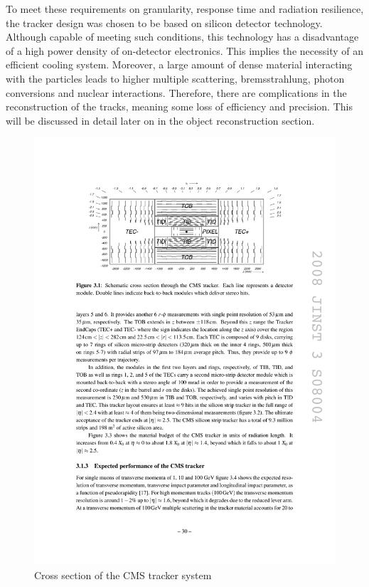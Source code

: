 To meet these requirements on granularity, response time and radiation resilience, the tracker design was chosen to be
based on silicon detector technology. Although capable of meeting such conditions, this technology has a disadvantage of
a high power density of on-detector electronics. This implies the necessity of an efficient cooling system. Moreover, a
large amount of dense material interacting with the particles leads to higher multiple scattering, bremsstrahlung,
photon conversions and nuclear interactions. Therefore, there are complications in the reconstruction of the tracks,
meaning some loss of efficiency and precision. This will be discussed in detail later on in the object reconstruction
section.

\begin{figure}[htbp]
  \centering
  \leavevmode
  \includegraphics[width=\columnwidth]{tracker}
  \caption[Cross section of the CMS tracker system]{Cross section of the CMS tracker system \autocite{CMS}}
  \label{fig:tracker}
\end{figure}

